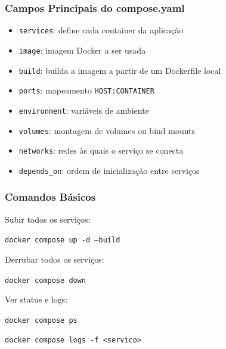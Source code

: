 \begin{frame}
  \frametitle{Campos Principais do compose.yaml}
  \begin{itemize}
    \item \texttt{services}: define cada container da aplicação
    \item \texttt{image}: imagem Docker a ser usada
    \item \texttt{build}: builda a imagem a partir de um Dockerfile local
    \item \texttt{ports}: mapeamento \texttt{HOST:CONTAINER}
    \item \texttt{environment}: variáveis de ambiente
    \item \texttt{volumes}: montagem de volumes ou bind mounts
    \item \texttt{networks}: redes às quais o serviço se conecta
    \item \texttt{depends\_on}: ordem de inicialização entre serviços
  \end{itemize}
\end{frame}

\begin{frame}
  \frametitle{Comandos Básicos}
  Subir todos os serviços:

  \vspace{0.3em}
  \texttt{docker compose up -d --build}

  \vspace{0.5em}
  Derrubar todos os serviços:

  \vspace{0.3em}
  \texttt{docker compose down}

  \vspace{0.5em}
  Ver status e logs:

  \vspace{0.3em}
  \texttt{docker compose ps}

  \vspace{0.3em}
  \texttt{docker compose logs -f <servico>}
\end{frame}
